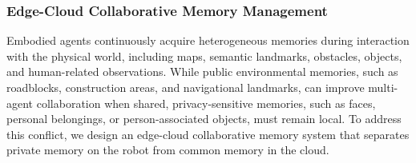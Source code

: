 

\subsubsection{Edge-Cloud Collaborative Memory Management}
\label{sec:memory-sync}

Embodied agents continuously acquire heterogeneous memories during interaction with the physical world, including maps, semantic landmarks, obstacles, objects, and human-related observations. 
While public environmental memories, such as roadblocks, construction areas, and navigational landmarks, can improve multi-agent collaboration when shared, privacy-sensitive memories, such as faces, personal belongings, or person-associated objects, must remain local. 
To address this conflict, we design an edge-cloud collaborative memory system that separates private memory on the robot from common memory in the cloud.

